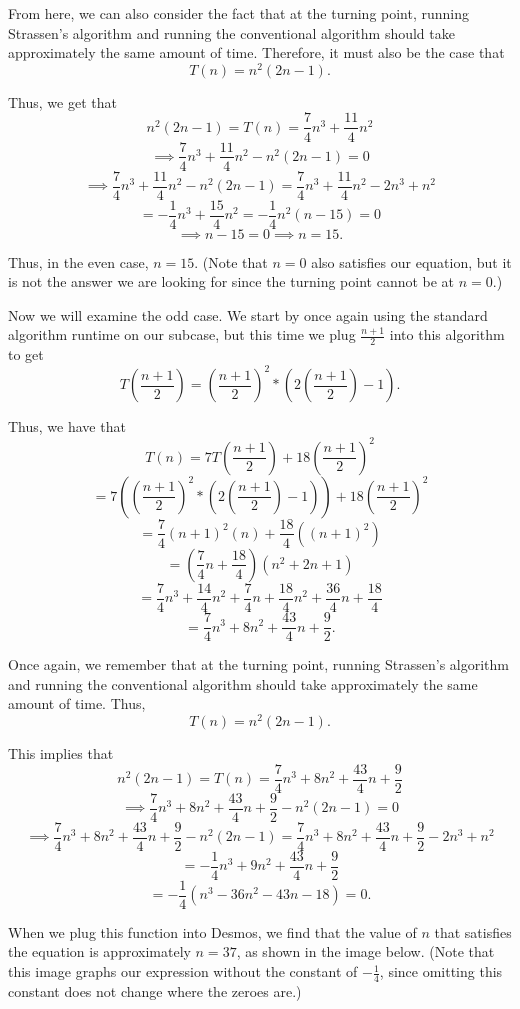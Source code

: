 \documentclass{article}
\begin{document}
From here, we can also consider the fact that at the turning point, running Strassen's algorithm and running the conventional algorithm should take approximately the same amount of time. Therefore, it must also be the case that $$T(n)=n^2(2n-1).$$

Thus, we get that $$n^2(2n-1) = T(n) = \frac{7}{4}n^3 + \frac{11}{4}n^2$$ $$\implies \frac{7}{4}n^3 + \frac{11}{4}n^2 - n^2(2n-1) = 0$$ $$\implies \frac{7}{4}n^3 + \frac{11}{4}n^2 - n^2(2n-1) = \frac{7}{4}n^3 + \frac{11}{4}n^2 - 2n^3 + n^2$$ $$=-\frac{1}{4}n^3+\frac{15}{4}n^2=-\frac{1}{4}n^2(n-15) = 0$$ $$\implies n-15=0 \implies n = 15.$$

Thus, in the even case, $n=15$. (Note that $n=0$ also satisfies our equation, but it is not the answer we are looking for since the turning point cannot be at $n=0$.)

\medskip

Now we will examine the odd case. We start by once again using the standard algorithm runtime on our subcase, but this time we plug $\frac{n+1}{2}$ into this algorithm to get $$T\left(\frac{n+1}{2}\right) = \left(\frac{n+1}{2}\right)^2*\left(2\left(\frac{n+1}{2}\right)-1\right).$$

Thus, we have that $$T(n)=7T\left(\frac{n+1}{2}\right) + 18\left(\frac{n+1}{2}\right)^2$$ $$= 7\left(\left(\frac{n+1}{2}\right)^2*\left(2\left(\frac{n+1}{2}\right)-1\right)\right) + 18\left(\frac{n+1}{2}\right)^2$$ $$=\frac{7}{4}(n+1)^2(n) + \frac{18}{4}((n+1)^2)$$ $$= \left(\frac{7}{4}n +\frac{18}{4} \right)(n^2+2n+1)$$ $$= \frac{7}{4}n^3 + \frac{14}{4}n^2 + \frac{7}{4}n +\frac{18}{4}n^2 + \frac{36}{4}n + \frac{18}{4}$$ $$=\frac{7}{4}n^3 + 8n^2 + \frac{43}{4}n + \frac{9}{2}.$$

Once again, we remember that at the turning point, running Strassen's algorithm and running the conventional algorithm should take approximately the same amount of time. Thus, $$T(n)=n^2(2n-1).$$

This implies that $$n^2(2n-1) = T(n) = \frac{7}{4}n^3 + 8n^2 + \frac{43}{4}n + \frac{9}{2}$$ $$\implies \frac{7}{4}n^3 + 8n^2 + \frac{43}{4}n + \frac{9}{2} - n^2(2n-1) = 0$$ $$ \implies \frac{7}{4}n^3 + 8n^2 + \frac{43}{4}n + \frac{9}{2} - n^2(2n-1) =  \frac{7}{4}n^3 + 8n^2 + \frac{43}{4}n + \frac{9}{2} - 2n^3 + n^2$$ $$= -\frac{1}{4}n^3 + 9n^2 + \frac{43}{4}n + \frac{9}{2}$$ $$= -\frac{1}{4}(n^3 - 36n^2 - 43n - 18) = 0.$$

When we plug this function into Desmos, we find that the value of $n$ that satisfies the equation is approximately $n=37$, as shown in the image below. (Note that this image graphs our expression without the constant of $-\frac{1}{4}$, since omitting this constant does not change where the zeroes are.) 
\end{document}
